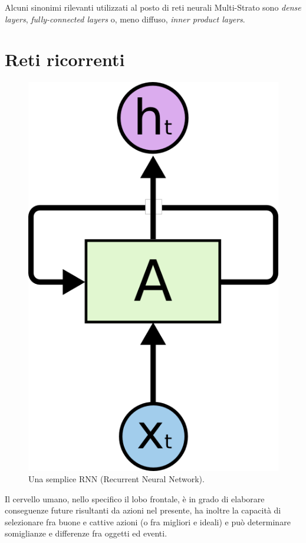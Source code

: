 Alcuni sinonimi rilevanti utilizzati al posto di reti neurali Multi-Strato 
sono \textit{dense layers}, \textit{fully-connected layers} o, meno diffuso, \textit{inner product layers}.
\section{Reti ricorrenti}
\label{sec:reti_ricorrenti}
\begin{figure}[ht]
	\centering
	\includegraphics{img/RNN.png}
	\caption{Una semplice RNN (Recurrent Neural Network).}
	\label{fig:1.4}
\end{figure}
Il cervello umano, nello specifico il lobo frontale, è in grado di elaborare conseguenze future risultanti da azioni nel presente, ha inoltre la capacità di selezionare fra buone e cattive azioni (o fra migliori e ideali) e può determinare somiglianze e differenze fra oggetti ed eventi.

